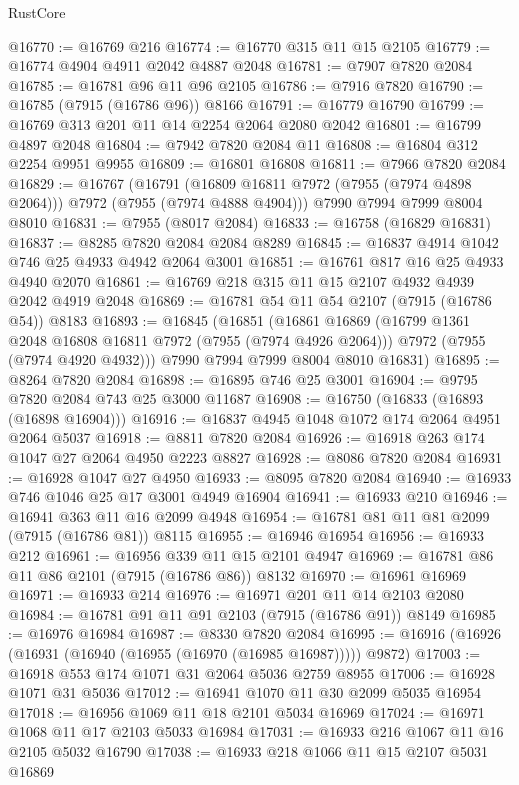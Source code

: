 \begin{lexlean}{RustCore}
\begin{coremodule}
@16770 := @16769 @216
@16774 := @16770 @315 @11 @15 @2105
@16779 := @16774 @4904 @4911 @2042 @4887 @2048
@16781 := @7907 @7820 @2084
@16785 := @16781 @96 @11 @96 @2105
@16786 := @7916 @7820
@16790 := @16785 (@7915 (@16786 @96)) @8166
@16791 := @16779 @16790
@16799 := @16769 @313 @201 @11 @14 @2254 @2064 @2080 @2042
@16801 := @16799 @4897 @2048
@16804 := @7942 @7820 @2084 @11
@16808 := @16804 @312 @2254 @9951 @9955
@16809 := @16801 @16808
@16811 := @7966 @7820 @2084
@16829 := @16767
    (@16791 (@16809 @16811 @7972 (@7955 (@7974 @4898 @2064))) @7972 (@7955 (@7974 @4888 @4904)))
    @7990
    @7994
    @7999
    @8004
    @8010
@16831 := @7955 (@8017 @2084)
@16833 := @16758 (@16829 @16831)
@16837 := @8285 @7820 @2084 @2084 @8289
@16845 := @16837 @4914 @1042 @746 @25 @4933 @4942 @2064 @3001
@16851 := @16761 @817 @16 @25 @4933 @4940 @2070
@16861 := @16769 @218 @315 @11 @15 @2107 @4932 @4939 @2042 @4919 @2048
@16869 := @16781 @54 @11 @54 @2107 (@7915 (@16786 @54)) @8183
@16893 := @16845
    (@16851
      (@16861
        @16869
        (@16799 @1361 @2048 @16808 @16811 @7972 (@7955 (@7974 @4926 @2064)))
        @7972
        (@7955 (@7974 @4920 @4932)))
      @7990
      @7994
      @7999
      @8004
      @8010
      @16831)
@16895 := @8264 @7820 @2084
@16898 := @16895 @746 @25 @3001
@16904 := @9795 @7820 @2084 @743 @25 @3000 @11687
@16908 := @16750 (@16833 (@16893 (@16898 @16904)))
@16916 := @16837 @4945 @1048 @1072 @174 @2064 @4951 @2064 @5037
@16918 := @8811 @7820 @2084
@16926 := @16918 @263 @174 @1047 @27 @2064 @4950 @2223 @8827
@16928 := @8086 @7820 @2084
@16931 := @16928 @1047 @27 @4950
@16933 := @8095 @7820 @2084
@16940 := @16933 @746 @1046 @25 @17 @3001 @4949 @16904
@16941 := @16933 @210
@16946 := @16941 @363 @11 @16 @2099 @4948
@16954 := @16781 @81 @11 @81 @2099 (@7915 (@16786 @81)) @8115
@16955 := @16946 @16954
@16956 := @16933 @212
@16961 := @16956 @339 @11 @15 @2101 @4947
@16969 := @16781 @86 @11 @86 @2101 (@7915 (@16786 @86)) @8132
@16970 := @16961 @16969
@16971 := @16933 @214
@16976 := @16971 @201 @11 @14 @2103 @2080
@16984 := @16781 @91 @11 @91 @2103 (@7915 (@16786 @91)) @8149
@16985 := @16976 @16984
@16987 := @8330 @7820 @2084
@16995 := @16916 (@16926 (@16931 (@16940 (@16955 (@16970 (@16985 @16987))))) @9872)
@17003 := @16918 @553 @174 @1071 @31 @2064 @5036 @2759 @8955
@17006 := @16928 @1071 @31 @5036
@17012 := @16941 @1070 @11 @30 @2099 @5035 @16954
@17018 := @16956 @1069 @11 @18 @2101 @5034 @16969
@17024 := @16971 @1068 @11 @17 @2103 @5033 @16984
@17031 := @16933 @216 @1067 @11 @16 @2105 @5032 @16790
@17038 := @16933 @218 @1066 @11 @15 @2107 @5031 @16869

\end{coremodule}
\end{lexlean}
